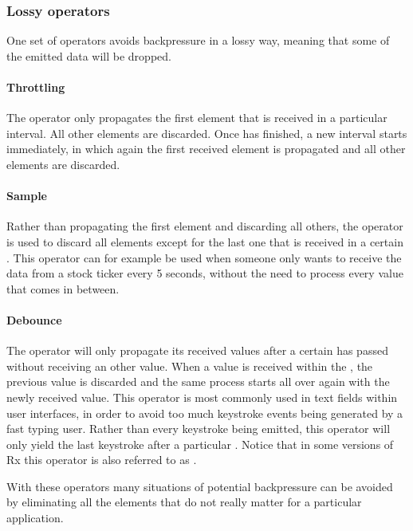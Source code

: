 \subsubsection{Lossy operators}
One set of operators avoids backpressure in a lossy way, meaning that some of the emitted data will be dropped.

\paragraph{Throttling} The  operator only propagates the first element that is received in a particular interval. All other elements are discarded. Once has finished, a new interval starts immediately, in which again the first received element is propagated and all other elements are discarded.

\paragraph{Sample} Rather than propagating the first element and discarding all others, the  operator is used to discard all elements except for the last one that is received in a certain . This operator can for example be used when someone only wants to receive the data from a stock ticker every 5 seconds, without the need to process every value that comes in between.

\paragraph{Debounce} The operator  will only propagate its received values after a certain  has passed without receiving an other value. When a value is received within the , the previous value is discarded and the same process starts all over again with the newly received value. This operator is most commonly used in text fields within user interfaces, in order to avoid too much keystroke events being generated by a fast typing user. Rather than every keystroke being emitted, this operator will only yield the last keystroke after a particular . Notice that in some versions of Rx this operator is also referred to as .

With these operators many situations of potential backpressure can be avoided by eliminating all the elements that do not really matter for a particular application.

